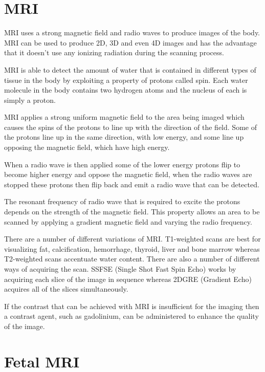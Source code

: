 \section{MRI}\label{background:mri}\cite{howmriworks}

MRI uses a strong magnetic field and radio waves to produce images of the body. MRI can be used to produce 2D, 3D and even 4D images and has the advantage that it doesn’t use any ionizing radiation during the scanning process.

MRI is able to detect the amount of water that is contained in different types of tissue in the body by exploiting a property of protons called spin. Each water molecule in the body contains two hydrogen atoms and the nucleus of each is simply a proton.

MRI applies a strong uniform magnetic field to the area being imaged which causes the spins of the protons to line up with the direction of the field. Some of the protons line up in the same direction, with low energy, and some line up opposing the magnetic field, which have high energy.

When a radio wave is then applied some of the lower energy protons flip to become higher energy and oppose the magnetic field, when the radio waves are stopped these protons then flip back and emit a radio wave that can be detected.

The resonant frequency of radio wave that is required to excite the protons depends on the strength of the magnetic field. This property allows an area to be scanned by applying a gradient magnetic field and varying the radio frequency.

There are a number of different variations of MRI. T1-weighted scans are best for visualizing fat, calcification, hemorrhage, thyroid, liver and bone marrow whereas T2-weighted scans accentuate water content.
There are also a number of different ways of acquiring the scan. SSFSE (Single Shot Fast Spin Echo) works by acquiring each slice of the image in sequence whereas 2DGRE (Gradient Echo) acquires all of the slices simultaneously.

If the contrast that can be achieved with MRI is insufficient for the imaging then a contrast agent, such as gadolinium, can be administered to enhance the quality of the image.

\section{Fetal MRI}\label{background:fetalmri}\cite{fetalmri}

